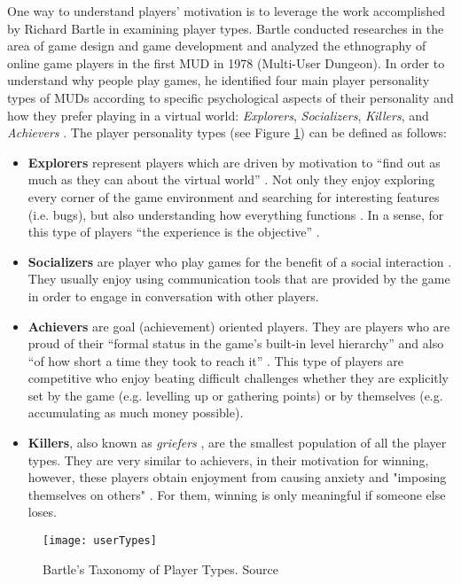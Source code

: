 One way to understand players' motivation is to leverage the work accomplished by Richard Bartle in examining player types. Bartle conducted researches in the area of game design and game development and analyzed the ethnography of online game players in the first MUD in 1978 (Multi-User Dungeon). In order to understand why people play games, he identified four main player personality types of MUDs according to specific psychological aspects of their personality and how they prefer playing in a virtual world: \textit{Explorers}, \textit{Socializers}, \textit{Killers}, and \textit{Achievers} \cite{bartle1996hearts}. The player personality types (see Figure \ref{fig:userTypes}) can be defined as follows:
\begin{itemize}
\item \textbf{Explorers} represent players which are driven by motivation to ``find out as much as they can about the 
virtual  world'' \cite{bartle1996hearts}. Not only they enjoy exploring every corner of the game environment and searching for interesting features (i.e. bugs), but also understanding  how 
everything functions \cite{bartle1996hearts}. 
In a sense, for this type of players ``the experience
is the objective'' \cite{zichermann2011gamification}.
\item \textbf{Socializers} are player who play games for the benefit of a social interaction \cite{zichermann2011gamification}. They usually enjoy using communication tools that are provided by the game in order to engage in conversation with other players. 
\item \textbf{Achievers} are goal (achievement) oriented players. They are players who are proud of their ``formal status in the game's built-in level hierarchy'' and also ``of how short a time they took to reach it'' \cite{bartle1996hearts}. This type of players are competitive who enjoy beating difficult challenges whether they are explicitly  set by the game (e.g.  levelling  up  or  gathering  points) or by themselves (e.g. accumulating as much money possible). 
\item \textbf{Killers}, also known as \textit{griefers} \cite{zichermann2011gamification}, are the smallest population of all the player types. They are very similar to achievers, in their motivation for winning, however, these players obtain  enjoyment from causing anxiety and "imposing  themselves  on  others" \cite{bartle1996hearts}. For them, winning is only meaningful if someone else loses.
\end{itemize}
\begin{figure}[h]
    \centering
    \texttt{[image: userTypes]}
    \caption{Bartle's Taxonomy of Player Types. Source \cite{bartle}}
    \label{fig:userTypes}
\end{figure}
